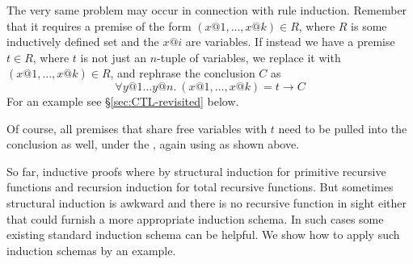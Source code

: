 \begin{isabellebody}
\begin{isamarkuptext}
The very same problem may occur in connection with rule induction. Remember
that it requires a premise of the form $(x@1,\dots,x@k) \in R$, where $R$ is
some inductively defined set and the $x@i$ are variables.  If instead we have
a premise $t \in R$, where $t$ is not just an $n$-tuple of variables, we
replace it with $(x@1,\dots,x@k) \in R$, and rephrase the conclusion $C$ as
\[ \forall y@1 \dots y@n.~ (x@1,\dots,x@k) = t \longrightarrow C \]
For an example see \S\ref{sec:CTL-revisited} below.

Of course, all premises that share free variables with $t$ need to be pulled into
the conclusion as well, under the \isa{{\isasymforall}}, again using \isa{{\isasymlongrightarrow}} as shown above.%
\end{isamarkuptext}%
%
%
\begin{isamarkuptext}%
\label{sec:complete-ind}
So far, inductive proofs where by structural induction for
primitive recursive functions and recursion induction for total recursive
functions. But sometimes structural induction is awkward and there is no
recursive function in sight either that could furnish a more appropriate
induction schema. In such cases some existing standard induction schema can
be helpful. We show how to apply such induction schemas by an example.


\end{isamarkuptext}
\end{isabellebody}
